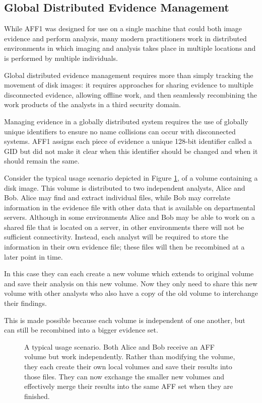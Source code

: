 \documentclass[10pt, conference]{IEEEtran}
\begin{document}
\subsection{Global Distributed Evidence Management}
While AFF1 was designed for use on a single machine that could both
image evidence and perform analysis, many modern practitioners work in
distributed environments in which imaging and analysis takes place in
multiple locations and is performed by multiple individuals. 


Global distributed evidence management requires more than simply
tracking the movement of disk images: it requires approaches for
sharing evidence to multiple disconnected evidence, allowing offline
work, and then seamlessly recombining the work products of the
analysts in a third security domain.

Managing evidence in a globally distributed system requires the use of
globally unique identifiers to ensure no name collisions can occur
with disconnected systems. AFF1 assigns each piece of evidence a
unique 128-bit identifier called a GID but did not make it clear when
this identifier should be changed and when it should remain the same.

Consider the typical usage scenario depicted in Figure \ref{usage}, of
a volume containing a disk image. This volume is distributed to two
independent analysts, Alice and Bob. Alice may find and extract
individual files, while Bob may correlate information in the evidence
file with other data that is available on departmental
servers. Although in some environments Alice and Bob may be able to
work on a shared file that is located on a server, in other
environments there will not be sufficient connectivity. Instead, each
analyst will be required to store the information in their own
evidence file; these files will then be recombined at a later point in
time.

In this case they can each create a new volume which extends to
original volume and save their analysis on this new volume. Now they
only need to share this new volume with other analysts who also have a
copy of the old volume to interchange their findings.

This is made possible because each volume is independent of one
another, but can still be recombined into a bigger evidence set. 

\begin{figure}[tb]
  \begin{center}
  \mbox{\columnwidth {}}
  \caption{A typical usage scenario. Both Alice and Bob receive an AFF
  volume but work independently. Rather than modifying the volume,
  they each create their own local volumes and save their results into
  those files. They can now exchange the smaller new volumes and
  effectively merge their results into the same AFF set when they are finished.}
  \label{usage}
  \end{center}
\end{figure}
\end{document}
